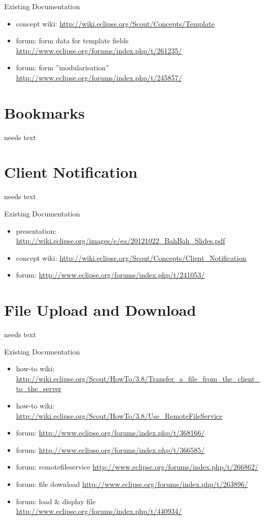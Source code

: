 \documentclass[a4paper,10pt,twoside]{book}
\begin{document}
\noindent Existing Documentation
\begin{itemize}
  \item concept wiki: \url{http://wiki.eclipse.org/Scout/Concepts/Template}
  \item forum: form data for template fields \url{http://www.eclipse.org/forums/index.php/t/261235/}
  \item forum: form ''modularisation'' \url{http://www.eclipse.org/forums/index.php/t/245857/}
\end{itemize}

\chapter{Bookmarks}
needs text

\chapter{Client Notification}
needs text

\noindent Existing Documentation
\begin{itemize}
  \item presentation: \url{http://wiki.eclipse.org/images/e/ea/20121022_BahBah_Slides.pdf}
  \item concept wiki: \url{http://wiki.eclipse.org/Scout/Concepts/Client_Notification}
  \item forum: \url{http://www.eclipse.org/forums/index.php/t/241053/}
\end{itemize}
      
\chapter{File Upload and Download}
needs text

\noindent Existing Documentation
\begin{itemize}
  \item how-to wiki: \url{http://wiki.eclipse.org/Scout/HowTo/3.8/Transfer_a_file_from_the_client_to_the_server}
  \item how-to wiki: \url{http://wiki.eclipse.org/Scout/HowTo/3.8/Use_RemoteFileService}
  \item forum: \url{http://www.eclipse.org/forums/index.php/t/368166/}
  \item forum: \url{http://www.eclipse.org/forums/index.php/t/366585/}
  \item forum: remotefileservice \url{http://www.eclipse.org/forums/index.php/t/266862/}
  \item forum: file download \url{http://www.eclipse.org/forums/index.php/t/263896/}
  \item forum: load \& display file \url{http://www.eclipse.org/forums/index.php/t/440934/}
\end{itemize}
\end{document}
